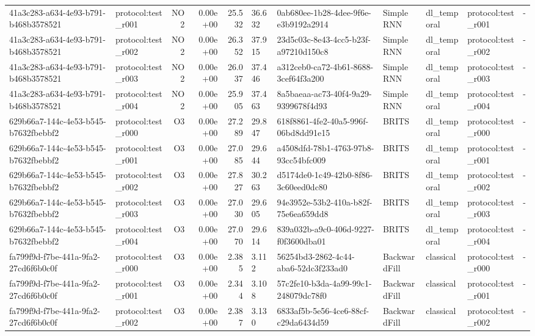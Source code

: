 \begin{table}[htbp]
\begin{tabular}{llrrr}
41a3c283-a634-4e93-b791-b468b3578521 & protocol:test\_r001 & NO2 & 0.00e+00 & 25.532 & 36.632 & 0ab680ee-1b28-4dee-9f6e-e3b9192a2914 & Simple RNN & dl\_temporal & protocol:test\_r001 & - \\
41a3c283-a634-4e93-b791-b468b3578521 & protocol:test\_r002 & NO2 & 0.00e+00 & 26.352 & 37.915 & 23d5c03c-8e43-4cc5-b23f-a97210d150c8 & Simple RNN & dl\_temporal & protocol:test\_r002 & - \\
41a3c283-a634-4e93-b791-b468b3578521 & protocol:test\_r003 & NO2 & 0.00e+00 & 26.037 & 37.446 & a312ceb0-ca72-4b61-8688-3cef64f3a200 & Simple RNN & dl\_temporal & protocol:test\_r003 & - \\
41a3c283-a634-4e93-b791-b468b3578521 & protocol:test\_r004 & NO2 & 0.00e+00 & 25.905 & 37.463 & 8a5baeaa-ac73-40f4-9a29-9399678f4d93 & Simple RNN & dl\_temporal & protocol:test\_r004 & - \\
629b66a7-144c-4e53-b545-b7632fbebbf2 & protocol:test\_r000 & O3 & 0.00e+00 & 27.289 & 29.847 & 618f8861-4fe2-40a5-996f-06bd8dd91e15 & BRITS & dl\_temporal & protocol:test\_r000 & - \\
629b66a7-144c-4e53-b545-b7632fbebbf2 & protocol:test\_r001 & O3 & 0.00e+00 & 27.085 & 29.644 & a4508dfd-78b1-4763-97b8-93cc54bfc009 & BRITS & dl\_temporal & protocol:test\_r001 & - \\
629b66a7-144c-4e53-b545-b7632fbebbf2 & protocol:test\_r002 & O3 & 0.00e+00 & 27.827 & 30.263 & d5174de0-1c49-42b0-8f86-3c60eed0dc80 & BRITS & dl\_temporal & protocol:test\_r002 & - \\
629b66a7-144c-4e53-b545-b7632fbebbf2 & protocol:test\_r003 & O3 & 0.00e+00 & 27.030 & 29.605 & 94e3952e-53b2-410a-b82f-75e6ea659dd8 & BRITS & dl\_temporal & protocol:test\_r003 & - \\
629b66a7-144c-4e53-b545-b7632fbebbf2 & protocol:test\_r004 & O3 & 0.00e+00 & 27.070 & 29.614 & 839a032b-a9c0-406d-9227-f0f3600dba01 & BRITS & dl\_temporal & protocol:test\_r004 & - \\
fa799f9d-f7be-441a-9fa2-27cd6f6b0c0f & protocol:test\_r000 & O3 & 0.00e+00 & 2.385 & 3.112 & 56254bd3-2862-4c44-aba6-52dc3f233ad0 & BackwardFill & classical & protocol:test\_r000 & - \\
fa799f9d-f7be-441a-9fa2-27cd6f6b0c0f & protocol:test\_r001 & O3 & 0.00e+00 & 2.344 & 3.108 & 57c2fe10-b3da-4a99-99c1-248079dc78f0 & BackwardFill & classical & protocol:test\_r001 & - \\
fa799f9d-f7be-441a-9fa2-27cd6f6b0c0f & protocol:test\_r002 & O3 & 0.00e+00 & 2.387 & 3.130 & 6833af5b-5e56-4ce6-88cf-c29da6434d59 & BackwardFill & classical & protocol:test\_r002 & - \\

\end{tabular}
\end{table}
